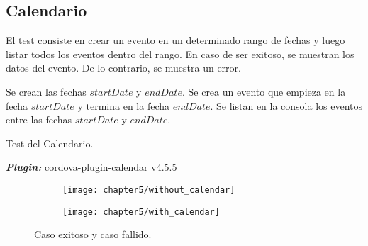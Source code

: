 \subsection{Calendario}
El test consiste en crear un evento en un determinado rango de fechas y luego listar todos los eventos dentro del rango. En caso de ser exitoso, se muestran los datos del evento. De lo contrario, se muestra un error.\\
\begin{algorithm}
	\begin{algorithmic}[1]
		\STATE Se crean las fechas $startDate$ y $endDate$.
		\STATE Se crea un evento que empieza en la fecha $startDate$ y termina en la fecha $endDate$.
		\STATE Se listan en la consola los eventos entre las fechas $startDate$ y $endDate$.
	\end{algorithmic}
	\caption{Test del Calendario.}\label{alg:chap5:test_calendario}
\end{algorithm}
\textbf{\emph{Plugin:}} \href{https://www.npmjs.com/package/cordova-plugin-calendar}{cordova-plugin-calendar v4.5.5}
\begin{figure}[hbtp]
    \centering
    \begin{subfigure}{0.3\linewidth}
        \texttt{[image: chapter5/without\_calendar]}
        \label{fig:ch05:without_calendar}
    \end{subfigure}
    \begin{subfigure}{0.3\linewidth}
        \texttt{[image: chapter5/with\_calendar]}
        \label{fig:ch05:with_calendar}
    \end{subfigure}
    \caption{Caso exitoso y caso fallido.}
	\label{fig:ch05:calendar-cases}
\end{figure}
\newpage
